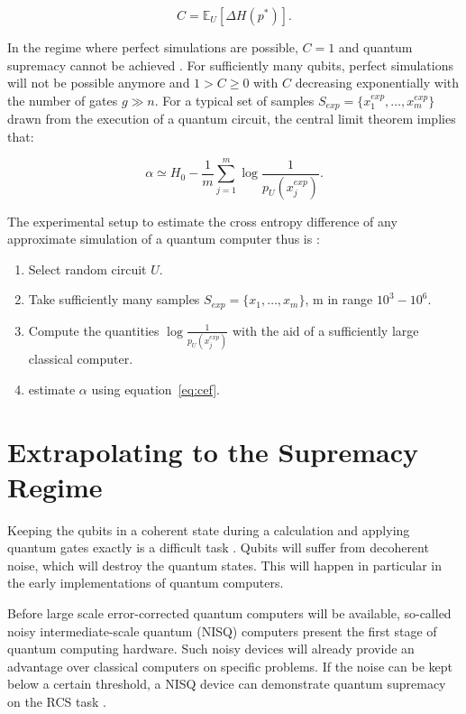 \begin{equation}
  C = \mathbb{E}_U[\Delta H(p^*)] .
\end{equation}

In the regime where perfect simulations are possible, $C=1$ and quantum
supremacy cannot be achieved \cite{Boixo2018supremacy}. For sufficiently many qubits, perfect simulations
will not be possible anymore and $1 > C \geq 0$ with $C$ decreasing exponentially
with the number of gates $g\gg n$. For a typical set of samples $S_{exp} = \{x_1^{exp}, \dots , x_m^{exp}\}$ drawn from the
execution of a quantum circuit, the central limit theorem implies that:

\begin{equation}
  \label{eq:cef}
  \alpha \simeq H_0 - \frac{1}{m} \sum_{j = 1}^m \log{\frac{1}{p_U(x_j^{exp})}}.
\end{equation}

The experimental setup to estimate the cross entropy difference of any
approximate simulation of a quantum computer thus is \cite{Boixo2018supremacy}:

\begin{enumerate}
\item Select random circuit $U$.
  \item Take sufficiently many samples $S_{exp} = \{x_1, \dots, x_m\}$, m in
    range $10^3-10^6$.
    \item Compute the quantities $\log{\frac{1}{p_U(x_j^{exp})}}$ with the aid
      of a sufficiently large classical computer.
      \item estimate $\alpha$ using equation~\ref{eq:cef}.
\end{enumerate}

\section{Extrapolating to the Supremacy Regime}

Keeping the qubits in a coherent state during a calculation and applying quantum
gates exactly is a difficult task \cite{martines2019supremacy}. Qubits will suffer from decoherent noise, which will destroy the quantum states. This will happen in particular in the early implementations of quantum computers.

Before large scale error-corrected quantum computers will be available, so-called noisy intermediate-scale quantum (NISQ) computers present the first stage
of quantum computing hardware. Such noisy devices will already provide an
advantage over classical computers on specific problems. If the noise can be
kept below a certain threshold, a NISQ device can demonstrate quantum
supremacy on the RCS task \cite{neill2018blueprint}.

